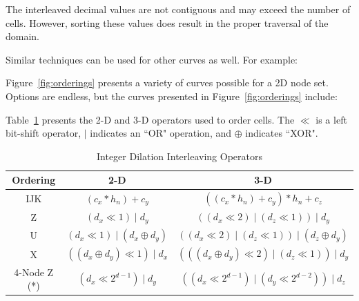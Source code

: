 \documentclass{report}
\begin{document}


The interleaved decimal values are not contiguous and may exceed the number of cells. However, sorting these values does result in the proper traversal of the domain. 


Similar techniques can be used for other curves as well. For example: 



Figure~\ref{fig:orderings} presents a variety of curves possible for a 2D node set. Options are endless, but the curves presented in Figure~\ref{fig:orderings} include: 





Table~\ref{tbl:orderings} presents the 2-D and 3-D operators used to order cells. The $\ll$ is a left bit-shift operator, $|$ indicates an ``OR" operation, and $\oplus$ indicates ``XOR". 

\begin{table}
\centering
\caption{Integer Dilation Interleaving Operators}
\label{tbl:orderings}
\begin{tabular}{ c | c | c }
  Ordering & 2-D & 3-D \\
  \hline                        
  IJK & $(c_x * h_n) + c_y$ & $((c_x * h_n) + c_y)*h_n + c_z$ \\
  Z & $(d_x \ll 1) \mid d_y$ & $((d_x \ll 2) \mid (d_z \ll 1)) \mid d_y$ \\
  U & $(d_x \ll 1) \mid (d_x \oplus d_y)$ & $((d_x \ll 2) \mid (d_z \ll 1)) \mid (d_z \oplus d_y)$ \\
  X & $((d_x \oplus d_y) \ll 1) \mid d_x$ & $(((d_x \oplus d_y) \ll 2) \mid (d_z \ll 1)) \mid d_y$ \\
  4-Node Z (*) & $(d_x \ll 2^{d-1}) \mid d_y$ & $((d_x \ll 2^{d-1}) \mid (d_y \ll 2^{d-2})) \mid d_z$ \\
  \hline  
\end{tabular}
\end{table}
\end{document}
